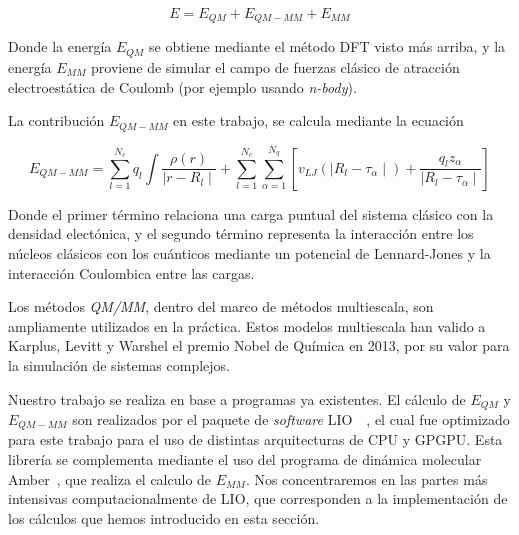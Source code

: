 \begin{equation}
    E = E_{QM} + E_{QM-MM} + E_{MM}
\end{equation}

Donde la energ\'ia $E_{QM}$ se obtiene mediante el m\'etodo DFT visto m\'as arriba, y la energ\'ia
$E_{MM}$ proviene de simular el campo de fuerzas cl\'asico de atracci\'on electroest\'atica de
Coulomb (por ejemplo usando \textit{n-body}).

La contribuci\'on $E_{QM-MM}$ en este trabajo, se calcula mediante la ecuaci\'on

\begin{equation}
    E_{QM-MM} = \sum_{l = 1}^{N_c} q_l \int \frac{\rho(r)}{\mid r - R_l \mid} + \sum_{l = 1}^{N_c}\sum_{\alpha = 1}^{N_q} [ v_{LJ} ( \mid R_l - \tau_\alpha \mid ) + \frac{q_l z_\alpha}{\mid R_l - \tau_\alpha \mid} ]
\end{equation}

Donde el primer t\'ermino relaciona una carga puntual del sistema cl\'asico con la densidad
elect\'onica, y el segundo t\'ermino representa la interacci\'on entre los n\'ucleos cl\'asicos
con los cu\'anticos mediante un potencial de Lennard-Jones y la interacci\'on Coulombica entre
las cargas.

Los m\'etodos \textit{QM/MM}, dentro del marco de m\'etodos multiescala, son ampliamente utilizados en
la pr\'actica. Estos modelos multiescala han valido a Karplus, Levitt y
Warshel el premio Nobel de Qu\'imica en 2013, por su valor para la simulaci\'on de sistemas complejos.

Nuestro trabajo se realiza en base a programas ya existentes. El c\'alculo de $E_{QM}$ y $E_{QM-MM}$ son realizados por el paquete de \textit{software} LIO~\cite{PaperNitscheManu}~\cite{TesisNitsche}, el cual fue optimizado para este trabajo para el uso de distintas arquitecturas de CPU y GPGPU. Esta librer\'ia
se complementa mediante el uso del programa de din\'amica molecular Amber~\cite{Amber}, que realiza el calculo
de $E_{MM}$. Nos concentraremos en las partes m\'as intensivas computacionalmente de LIO, que corresponden a la
implementaci\'on de los c\'alculos que hemos introducido en esta secci\'on.
